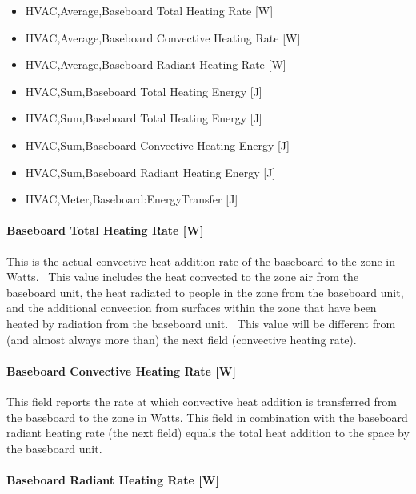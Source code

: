 \begin{itemize}
\item
  HVAC,Average,Baseboard Total Heating Rate {[}W{]}
\item
  HVAC,Average,Baseboard Convective Heating Rate {[}W{]}
\item
  HVAC,Average,Baseboard Radiant Heating Rate {[}W{]}
\item
  HVAC,Sum,Baseboard Total Heating Energy {[}J{]}
\item
  HVAC,Sum,Baseboard Total Heating Energy {[}J{]}
\item
  HVAC,Sum,Baseboard Convective Heating Energy {[}J{]}
\item
  HVAC,Sum,Baseboard Radiant Heating Energy {[}J{]}
\item
  HVAC,Meter,Baseboard:EnergyTransfer {[}J{]}
\end{itemize}

\paragraph{Baseboard Total Heating Rate {[}W{]}}\label{baseboard-total-heating-rate-w-000}

This is the actual convective heat addition rate of the baseboard to the zone in Watts.~ This value includes the heat convected to the zone air from the baseboard unit, the heat radiated to people in the zone from the baseboard unit, and the additional convection from surfaces within the zone that have been heated by radiation from the baseboard unit.~ This value will be different from (and almost always more than) the next field (convective heating rate).

\paragraph{Baseboard Convective Heating Rate {[}W{]}}\label{baseboard-convective-heating-rate-w-000}

This field reports the rate at which convective heat addition is transferred from the baseboard to the zone in Watts.  This field in combination with the baseboard radiant heating rate (the next field) equals the total heat addition to the space by the baseboard unit.

\paragraph{Baseboard Radiant Heating Rate {[}W{]}}\label{baseboard-radiant-heating-rate-w-000}


